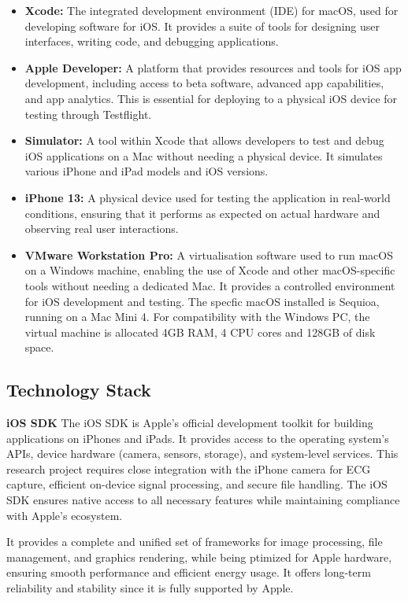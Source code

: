 \begin{itemize}
    \item \textbf{Xcode:} The integrated development environment (IDE) for macOS, used for developing software for iOS. It provides a suite of tools for designing user interfaces, writing code, and debugging applications.
    \item \textbf{Apple Developer:} A platform that provides resources and tools for iOS app development, including access to beta software, advanced app capabilities, and app analytics. This is essential for deploying to a physical iOS device for testing through Testflight.
    \item \textbf{Simulator:} A tool within Xcode that allows developers to test and debug iOS applications on a Mac without needing a physical device. It simulates various iPhone and iPad models and iOS versions.
    \item \textbf{iPhone 13:} A physical device used for testing the application in real-world conditions, ensuring that it performs as expected on actual hardware and observing real user interactions.
    \item \textbf{VMware Workstation Pro:} A virtualisation software used to run macOS on a Windows machine, enabling the use of Xcode and other macOS-specific tools without needing a dedicated Mac. It provides a controlled environment for iOS development and testing. The specfic macOS installed is Sequioa, running on a Mac Mini 4. For compatibility with the Windows PC, the virtual machine is allocated 4GB RAM, 4 CPU cores and 128GB of disk space.
\end{itemize}

\subsection{Technology Stack}

\textbf{iOS SDK}   
The iOS SDK is Apple’s official development toolkit for building applications on iPhones and iPads. It provides access to the operating system’s APIs, device hardware (camera, sensors, storage), and system-level services. This research project requires close integration with the iPhone camera for ECG capture, efficient on-device signal processing, and secure file handling. The iOS SDK ensures native access to all necessary features while maintaining compliance with Apple’s ecosystem.  

It provides a complete and unified set of frameworks for image processing, file management, and graphics rendering, while being ptimized for Apple hardware, ensuring smooth performance and efficient energy usage. It offers long-term reliability and stability since it is fully supported by Apple.  

